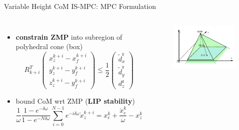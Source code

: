 \documentclass[10pt]{beamer}
\begin{document}
\begin{frame}{Variable Height CoM IS-MPC: MPC Formulation}
  \begin{columns}[c,onlytextwidth]
			\begin{itemize}
			  \item \textbf{constrain ZMP} into subregion of polyhedral cone (box)
					\begin{equation*}
						R_{k+i}^T
						\begin{pmatrix}
							x_z^{k+i} - x_f^{k+i} \\
							y_z^{k+i} - y_f^{k+i} \\
							z_z^{k+i} - y_f^{k+i}
						\end{pmatrix}
						\le
						\frac{1}{2}
						\begin{pmatrix}
							\tilde{d}_x^\text{z} \\
							\tilde{d}_y^\text{z} \\
							d_z^\text{z}
						\end{pmatrix}
					\end{equation*}
				\item bound CoM wrt ZMP (\textbf{LIP stability})
					\begin{equation*}
						\frac{1}{\omega}\frac{1-e^{-\delta\omega}}{1-e^{-N\delta\omega}}
							\sum_{i=0}^{N-1} e^{-i\delta\omega} \dot{x}_z^{k+i} =
							x_c^k + \frac{\dot{x}_c^k}{\omega} - x_z^k
					\end{equation*}
			\end{itemize}
		  \begin{figure}
				\centering
				\includegraphics[width=\textwidth]{figures/balance3d.pdf}

\end{figure}
\end{columns}
\end{frame}
\end{document}
